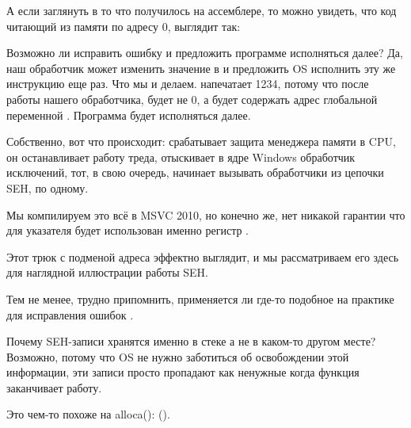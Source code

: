 А если заглянуть в то что получилось на ассемблере,
то можно увидеть, что код читающий из памяти по адресу 0, выглядит так:



Возможно ли  исправить ошибку и предложить программе исполняться далее?
Да, наш обработчик может изменить значение в \EAX и предложить \ac{OS} исполнить эту же инструкцию еще раз.
Что мы и делаем. \printf напечатает 1234, потому что после работы нашего обработчика, \EAX будет не 0,
а будет содержать адрес глобальной переменной .
Программа будет исполняться далее.

Собственно, вот что происходит: срабатывает защита менеджера памяти в \ac{CPU}, 
он останавливает работу треда, отыскивает в ядре Windows обработчик исключений, 
тот, в свою очередь, начинает вызывать обработчики из цепочки \ac{SEH}, по одному.

Мы компилируем это всё в MSVC 2010, но конечно же, нет никакой гарантии 
что для указателя будет использован именно регистр \EAX.

Этот трюк с подменой адреса эффектно выглядит, и мы рассматриваем его здесь для наглядной иллюстрации работы \ac{SEH}.

Тем не менее, трудно припомнить, применяется ли где-то подобное на практике для исправления ошибок .

Почему SEH-записи хранятся именно в стеке а не в каком-то другом месте?
Возможно, потому что \ac{OS} не нужно заботиться об освобождении этой информации, эти записи
просто пропадают как ненужные когда функция заканчивает работу.

Это чем-то похоже на alloca(): ().

